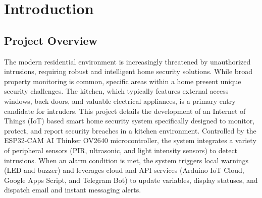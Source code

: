 \documentclass[11pt,a4paper]{report}
\begin{document}
\begin{abstract}
Residential security has evolved rapidly with the rise of the Internet of Things (IoT). Kitchen areas represent a critical point of vulnerability in residential properties, as they often contain external entrance points (windows and back doors) and high-value appliances. Traditional security systems rely on single-sensor solutions that suffer from high false-alarm rates or are easily bypassed. This report presents a prototype-level design and implementation of an IoT-Based Multi-Sensor Anti-Theft System for Kitchen Areas utilizing an ESP32-CAM AI Thinker OV2640 with an ESP32-CAM-MB programmer. By incorporating sensor fusion logic involving a Passive Infrared (PIR) sensor, an ultrasonic distance sensor, and a Light Dependent Resistor (LDR), the system achieves resilient intrusion detection while significantly reducing false alarms caused by household pets. Furthermore, a DS1307 Real-Time Clock (RTC) ensures automated security state recovery after power failure events. The system interfaces with the Arduino IoT Cloud platform to provide a role-based user experience using three separate dashboards tailored for children, parents, and administrative monitoring. Real-time emergency escalation is supported via Google Apps Script for automated email warnings and a Telegram Bot for instant messaging notifications. Practical testing confirms that the multi-sensor approach improves security robustness and tampering resistance, demonstrating a highly effective local-to-cloud security integration.
\end{abstract}
\tableofcontents
\listoffigures
\listoftables
\clearpage
{}
\chapter{Introduction}
\section{Project Overview}
The modern residential environment is increasingly threatened by unauthorized intrusions, requiring robust and intelligent home security solutions. While broad property monitoring is common, specific areas within a home present unique security challenges. The kitchen, which typically features external access windows, back doors, and valuable electrical appliances, is a primary entry candidate for intruders. 
This project details the development of an Internet of Things (IoT) based smart home security system specifically designed to monitor, protect, and report security breaches in a kitchen environment. Controlled by the ESP32-CAM AI Thinker OV2640 microcontroller, the system integrates a variety of peripheral sensors (PIR, ultrasonic, and light intensity sensors) to detect intrusions. When an alarm condition is met, the system triggers local warnings (LED and buzzer) and leverages cloud and API services (Arduino IoT Cloud, Google Apps Script, and Telegram Bot) to update variables, display statuses, and dispatch email and instant messaging alerts.
\end{document}

